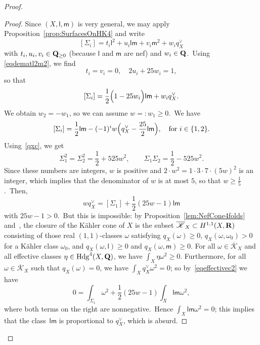 \documentclass[12pt]{amsart}
\def\cK{\mathscr{K}}
\def\R{{\bf R}}
\def\Q{{\bf Q}}
\DeclareMathOperator{\Hdg}{Hdg}
\theoremstyle{remark}
\def\lll{\ensuremath{\mathsf l}}
\def\mm{\ensuremath{\mathsf m}}
\begin{document}
\begin{proof}
\begin{proof}
Since $(X,\lll,\mm)$ is very general, we may apply Proposition~\ref{prop:SurfacesOnHK4} and write
\[
[\Sigma_i]=t_{i} \lll^2+u_{i}\lll\mm+v_{i} \mm^2+w_{i} q_X^\vee
\]
with $t_{i}, u_i,v_i\in \Q_{\ge0} $ (because $\lll$ and $\mm$ are nef) and $w_i\in \Q $.\
Using \eqref{eqdematl2m2}, we find
\begin{equation*}\label{eqpoureta3eta4}
t_{i}=v_i=0,\quad 2u_{i}+25w_{i}=1,
\end{equation*}
so that
\[
[\Sigma_i]=\frac{1}{2}\Bigl(1-25w_{i}\Bigr) \lll\mm+w_{i} q_X^\vee.
\]
We obtain $w_2=- w_1$, so we can assume $w=:w_1\geq 0$.\
We have
\begin{equation*}\label{eqSigmai}
[\Sigma_i]=\frac{1}{2}\lll\mm-(-1)^i w\Bigl(q_X^\vee-\frac{25}2\lll\mm\Bigr),\quad \textnormal{for }i\in\{1,2\}.
\end{equation*}
Using~\eqref{qxc}, we get
\begin{equation*}\label{eqnumbres}
\Sigma_1^2= \Sigma_2^2=\frac{1}{2}+525w^2,\qquad \Sigma_1\Sigma_2=\frac{1}{2}-525w^2.
\end{equation*}
Since these numbers are integers, $w$ is positive and $2\cdot w^2=1\cdot 3\cdot 7\cdot (5w)^2$ is an integer, which implies that the denominator of $w$ is at most $5$, so that $w\geq \frac{1}{5}$.\
Then,
\begin{equation}\label{eqeffectivec2}
w q_X^\vee=[\Sigma_1]+\frac{1}{2}(25w -1)\lll\mm
\end{equation}
with $25w -1>0$.\ But this is impossible: by Proposition~\ref{lem:NefCone4folds} and~\cite[Proposition 3.2]{huyKahler}, the closure of the K\"ahler cone of $X$ is the subset $\overline{\cK}_X\subset H^{1,1}(X,\R)$ consisting of those real $(1,1)$-classes $\omega$ satisfying $q_X(\omega)\geq 0$, $q_X(\omega,\omega_0)>0$ for a K\"ahler class $\omega_0$, and $q_X(\omega,\lll)\ge0$ and $ q_X(\omega,\mm)\geq0$.
For all $\omega\in \overline{\cK}_X$ and all effective classes $\eta\in{\Hdg}^4(X,\Q)$, we have $\int_X\eta\omega^2\geq 0$.
Furthermore, for all $\omega\in \overline{\cK}_X$ such that $q_X(\omega)=0$, we have $\int_X q_X^\vee \omega^2=0$; so by~\eqref{eqeffectivec2} we have
\[
0=\int_{\Sigma_1}\omega^2+\frac{1}{2}(25w -1)\int_X\lll\mm\omega^2,
\]
where both terms on the right are nonnegative.\
Hence $\int_X\lll\mm\omega^2=0$; this implies that the class~$\lll\mm$ is proportional to $q_X^\vee$, which is absurd.


\end{proof}
\end{proof}
\end{document}
